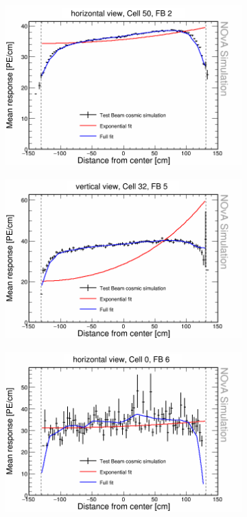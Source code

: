 \begin{figure}[h]
  \begin{subfigure}{0.495\textwidth}
    \includegraphics[width=\linewidth]{Plots/RelativeCalibrationResults/sim_fb2_001_050.png}
  \end{subfigure}
  \begin{subfigure}{0.495\textwidth}
    \includegraphics[width=\linewidth]{Plots/RelativeCalibrationResults/sim_fb5_000_032.png}
  \end{subfigure}
  \begin{subfigure}{0.495\textwidth}
    \includegraphics[width=\linewidth]{Plots/RelativeCalibrationResults/sim_fb6_001_000.png}

\end{subfigure}
\end{figure}
